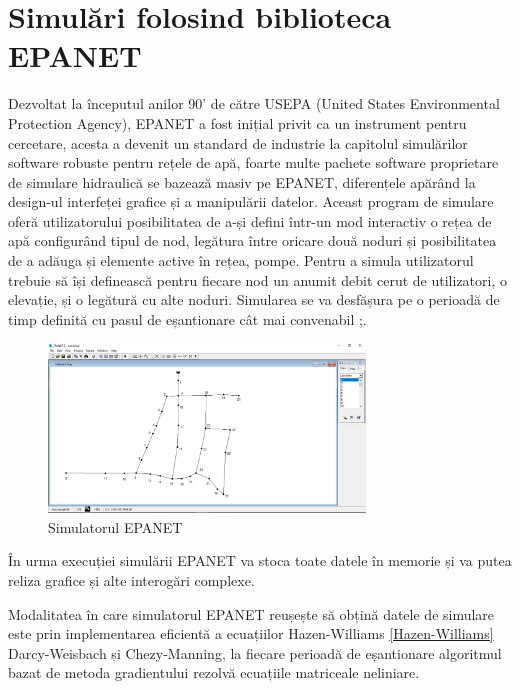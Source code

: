 \section{Simulări folosind biblioteca EPANET}

Dezvoltat la începutul anilor 90' de către USEPA (United States Environmental Protection Agency), EPANET a fost inițial privit ca un instrument pentru cercetare, acesta a devenit un standard de industrie la capitolul simulărilor software robuste pentru rețele de apă, foarte multe pachete software proprietare de simulare hidraulică se bazează masiv pe EPANET, diferențele apărând la design-ul interfeței grafice și a manipulării datelor. Aceast program de simulare oferă utilizatorului posibilitatea de a-și defini într-un mod interactiv o rețea de apă configurând tipul de nod, legătura între oricare două noduri și posibilitatea de a adăuga și elemente active în rețea, pompe. Pentru a simula utilizatorul trebuie să își definească pentru fiecare nod un anumit debit cerut de utilizatori, o elevație, și o legătură cu alte noduri. Simularea se va desfășura pe o perioadă de timp definită cu pasul de eșantionare cât mai convenabil ;\cite{rossman2000epanet}.
	
\begin{figure}[H]
\centering
\label{fig:epanet_simulator_win}
\includegraphics[width=0.75\textwidth]{pics/c2_pics/epanet_simulator.png}
\caption{Simulatorul EPANET}
\end{figure}

În urma execuției simulării EPANET va stoca toate datele în memorie și va putea reliza grafice și alte interogări complexe.

Modalitatea în care simulatorul EPANET reușește să obțină datele de simulare este prin implementarea eficientă a ecuațiilor  Hazen-Williams \eqref{Hazen-Williams} Darcy-Weisbach și Chezy-Manning, la fiecare perioadă de eșantionare algoritmul bazat de metoda gradientului rezolvă ecuațiile matriceale neliniare.

